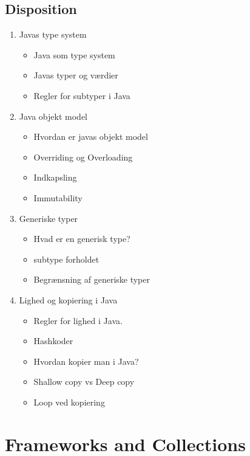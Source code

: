 \documentclass{article}
\begin{document}
\subsection{Disposition}
\begin{enumerate}
	\item Javas type system
	\begin{itemize}
		\item Java som type system
		\item Javas typer og værdier
		\item Regler for subtyper i Java
	\end{itemize}
	\item Java objekt model 
	\begin{itemize}
		\item Hvordan er javas objekt model
		\item Overriding og Overloading
		\item Indkapsling
		\item Immutability
	\end{itemize}
	\item Generiske typer
	\begin{itemize}
		\item Hvad er en generisk type?
		\item subtype forholdet
		\item Begrænsning af generiske typer
	\end{itemize}
	\item Lighed og kopiering i Java
	\begin{itemize}
		\item Regler for lighed i Java. 
		\item Hashkoder
		\item Hvordan kopier man i Java?
		\item Shallow copy vs Deep copy
		\item Loop ved kopiering
	\end{itemize}
\end{enumerate}
\newpage

\section{Frameworks and Collections}
\end{document}
